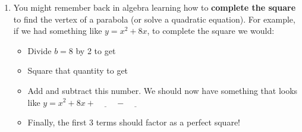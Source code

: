 \documentclass[fleqn]{article}
\theoremstyle{definition}
\begin{document}
\begin{enumerate}
\begin{enumerate}
\begin{multicols}{2}
 $1 = \underline{\hspace{1cm}}$

\vspace{.25cm}
 $1 + 2 = \underline{\hspace{1cm}}$

\vspace{.25cm}
 $1 + 2 + 3 = \underline{\hspace{1cm}}$

\vspace{.25cm}
 $1 + 2 + 3 + 4 = \underline{\hspace{1cm}}$
\end{multicols}



\item Based on the results above, hypothesize a formula for the sum of the first n cubes, $1^3+2^3+3^3+ \ldots + n^3$? 


 \vspace{.25cm}
(This is a famous formula that has a beautiful, albeit more complex, visual proof.)
\end{enumerate}

\newpage


\item You might remember back in algebra learning how to \textbf{complete the square} to find the vertex of a parabola (or solve a quadratic equation). For example, if we had something like $y=x^2+8x$, to complete the square we would:

\begin{itemize}
\item Divide $b=8$ by 2 to get \underline{\hspace{1cm}}
\item Square that quantity to get \underline{\hspace{1cm}}
\item Add and subtract this number. We should now have something that looks like $y= x^2 + 8x + \underline{\hspace{1cm}} - \underline{\hspace{1cm}}$
\item Finally, the first 3 terms should factor as a perfect square!
\end{itemize}


\end{enumerate}
\end{document}
